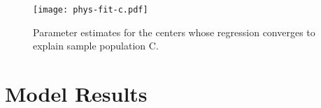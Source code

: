 \begin{figure}
    \texttt{[image: phys-fit-c.pdf]}%
    \caption[Population C: Parameter Estimates]{Parameter estimates for the centers whose regression converges to explain sample population C.}%
    \label{fig:phys-fit-c}
\end{figure}


\section{Model Results}
